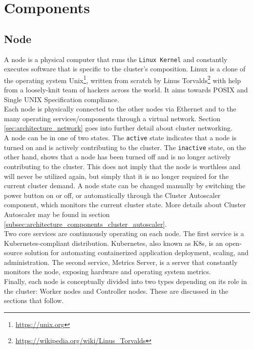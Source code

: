 \section{Components}
\label{sec:architecture_components}

\subsection{Node}
\label{subsec:architecture_components_node}

A node is a physical computer that runs the \texttt{Linux Kernel} and constantly
executes software that is specific to the cluster's composition. Linux is a
clone of the operating system Unix\footnote{\url{https://unix.org}}, written from
scratch by Linus Torvalds\footnote{\url{https://wikipedia.org/wiki/Linus_Torvalds}}
with help from a loosely-knit team of hackers across the world. It aims towards
POSIX and Single UNIX Specification compliance\cite{linux}.\\ %
Each node is physically connected to the other nodes via Ethernet and to the
many operating services/components through a virtual network. Section \ref{sec:architecture_network}
goes into further detail about cluster networking. \\ %
A node can be in one of two states. The \texttt{active} state indicates that a node
is turned on and is actively contributing to the cluster. The \texttt{inactive} state,
on the other hand, shows that a node has been turned off and is no longer actively
contributing to the cluster. This does not imply that the node is worthless and
will never be utilized again, but simply that it is no longer required for the current
cluster demand. A node state can be changed manually by switching the power
button on or off, or automatically through the Cluster Autoscaler component,
which monitors the current cluster state. More details about Cluster Autoscaler may
be found in section \ref{subsec:architecture_components_cluster_autoscaler}. \\ %
Two core services are continuously operating on each node. The first service is
a Kubernetes-compliant distribution. Kubernetes, also known as K8s, is an open-source
solution for automating containerized application deployment, scaling, and administration\cite{k8s}.
The second service, Metrics Server, is a server that constantly monitors the node,
exposing hardware and operating system metrics. \\ %
Finally, each node is conceptually divided into two types depending on its role in
the cluster: Worker nodes and Controller nodes. These are discussed in the sections
that follow.


